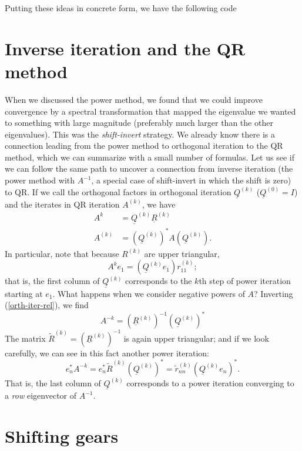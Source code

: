 \documentclass[12pt, leqno]{article} %
\newcommand{\uQ}{\underline{Q}}
\newcommand{\uR}{\underline{R}}
\begin{document}
Putting these ideas in concrete form, we have the following code


\section{Inverse iteration and the QR method}

When we discussed the power method, we found that we could improve
convergence by a spectral transformation that mapped the eigenvalue we
wanted to something with large magnitude (preferably much larger than
the other eigenvalues).  This was the {\em shift-invert} strategy.
We already know there is a connection leading from the power method
to orthogonal iteration to the QR method, which we can summarize with
a small number of formulas.  Let us see if we can follow the same
path to uncover a connection from inverse iteration (the power method
with $A^{-1}$, a special case of shift-invert in which the shift is zero) to QR.
If we call the orthogonal factors
in orthogonal iteration  $\uQ^{(k)}$ ($\uQ^{(0)} = I$) and the iterates
in QR iteration $A^{(k)}$, we have
\begin{align}
  A^{k}   &= \uQ^{(k)} \uR^{(k)} \label{orth-iter-rel} \\
  A^{(k)} &= (\uQ^{(k)})^* A (\uQ^{(k)}).
\end{align}
In particular, note that because $R^{(k)}$ are upper triangular,
\[
  A^{k} e_1 = (\uQ^{(k)} e_1) r^{(k)}_{11};
\]
that is, the first column of $\uQ^{(k)}$ corresponds to the $k$th
step of power iteration starting at $e_1$.  What happens when we
consider negative powers of $A$?  Inverting (\ref{orth-iter-rel}),
we find
\[
  A^{-k} = (\uR^{(k)})^{-1} (\uQ^{(k)})^*
\]
The matrix $\tilde{R}^{(k)} = (\uR^{(k)})^{-1}$ is again upper triangular;
and if we look carefully, we can see in this fact another power iteration:
\[
  e_n^* A^{-k} = e_n^* \tilde{R}^{(k)} (\uQ^{(k)})^*
              = \tilde{r}^{(k)}_{nn} (\uQ^{(k)} e_n)^*.
\]
That is, the last column of $\uQ^{(k)}$ corresponds to a power iteration
converging to a {\em row} eigenvector of $A^{-1}$.

\section{Shifting gears}
\end{document}
